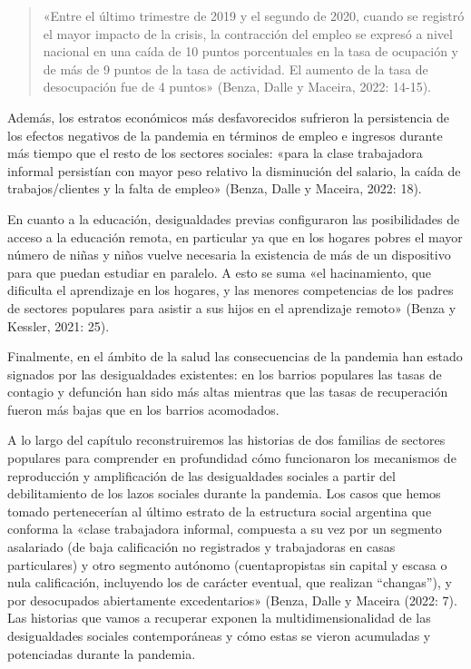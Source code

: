 \begin{quote}
«Entre el último trimestre de 2019 y el segundo de 2020, cuando se registró el mayor impacto de la crisis, la contracción del empleo se expresó a nivel nacional en una caída de 10 puntos porcentuales en la tasa de ocupación y de más de 9 puntos de la tasa de actividad. El aumento de la tasa de desocupación fue de 4 puntos» (Benza, Dalle y Maceira, 2022: 14-15).
\end{quote}

Además, los estratos económicos más desfavorecidos sufrieron la persistencia de los efectos negativos de la pandemia en términos de empleo e ingresos durante más tiempo que el resto de los sectores sociales: «para la clase trabajadora informal persistían con mayor peso relativo la disminución del salario, la caída de trabajos/clientes y la falta de empleo» (Benza, Dalle y Maceira, 2022: 18).

En cuanto a la educación, desigualdades previas configuraron las posibilidades de acceso a la educación remota, en particular ya que en los hogares pobres el mayor número de niñas y niños vuelve necesaria la existencia de más de un dispositivo para que puedan estudiar en paralelo. A esto se suma «el hacinamiento, que dificulta el aprendizaje en los hogares, y las menores competencias de los padres de sectores populares para asistir a sus hijos en el aprendizaje remoto» (Benza y Kessler, 2021: 25).

Finalmente, en el ámbito de la salud las consecuencias de la pandemia han estado signados por las desigualdades existentes: en los barrios populares las tasas de contagio y defunción han sido más altas mientras que las tasas de recuperación fueron más bajas que en los barrios acomodados.

A lo largo del capítulo reconstruiremos las historias de dos familias de sectores populares para comprender en profundidad cómo funcionaron los mecanismos de reproducción y amplificación de las desigualdades sociales a partir del debilitamiento de los lazos sociales durante la pandemia. Los casos que hemos tomado pertenecerían al último estrato de la estructura social argentina que conforma la «clase trabajadora informal, compuesta a su vez por un segmento asalariado (de baja calificación no registrados y trabajadoras en casas particulares) y otro segmento autónomo (cuentapropistas sin capital y escasa o nula calificación, incluyendo los de carácter eventual, que realizan ``changas''), y por desocupados abiertamente excedentarios» (Benza, Dalle y Maceira (2022: 7). Las historias que vamos a recuperar exponen la multidimensionalidad de las desigualdades sociales contemporáneas y cómo estas se vieron acumuladas y potenciadas durante la pandemia.

